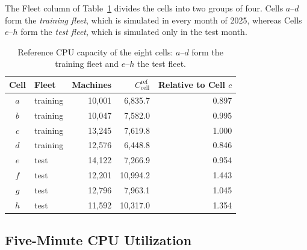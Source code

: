 \documentclass{UNCC-thesis}
\begin{document}
The Fleet column of Table~\ref{tab:cell-capacity} divides the cells into two groups of four.
Cells \(a\)--\(d\) form the \emph{training fleet}, which is simulated in every month of 2025,
whereas Cells \(e\)--\(h\) form the \emph{test fleet}, which is simulated only in the test
month. 

\begin{table}[htbp]
  \centering
  \footnotesize
  \caption[Reference CPU capacity of the eight cells]{Reference CPU capacity of the eight cells: \(a\)--\(d\) form the
  training fleet and \(e\)--\(h\) the test fleet.}
  \label{tab:cell-capacity}
  \begin{tabular}{@{}clrrr@{}}
    \toprule
    Cell & Fleet & Machines & \(C^{\mathrm{ref}}_{\mathrm{cell}}\) & Relative to Cell \(c\) \\
    \midrule
    \(a\) & training & 10,001 & 6,835.7 & 0.897 \\
    \(b\) & training & 10,047 & 7,582.0 & 0.995 \\
    \(c\) & training & 13,245 & 7,619.8 & 1.000 \\
    \(d\) & training & 12,576 & 6,448.8 & 0.846 \\
    \addlinespace
    \(e\) & test & 14,122 & 7,266.9 & 0.954 \\
    \(f\) & test & 12,201 & 10,994.2 & 1.443 \\
    \(g\) & test & 12,796 & 7,963.1 & 1.045 \\
    \(h\) & test & 11,592 & 10,317.0 & 1.354 \\
    \bottomrule
  \end{tabular}
\end{table}

\subsection{Five-Minute CPU Utilization}
\label{subsec:clusterdata-utilization}
\end{document}
